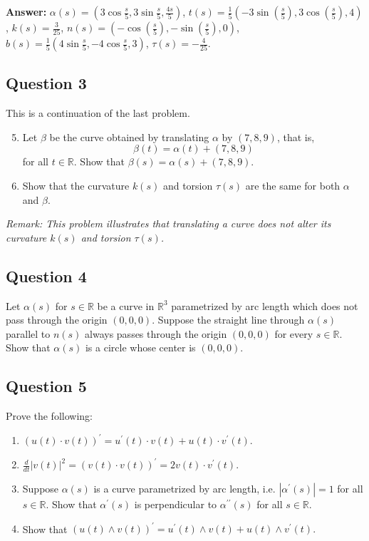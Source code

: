 \documentclass[12pt, a4paper]{article}
\newcommand{\R}{\mathbb{R}}
\begin{document}
\vspace{1em}
\noindent\textbf{Answer:}
$\alpha(s)=(3\cos\frac{s}{5},3\sin\frac{s}{5},\frac{4s}{5})$, 
$t(s)=\frac{1}{5}(-3\sin(\frac{s}{5}),3\cos(\frac{s}{5}),4)$, 
$k(s)=\frac{3}{25}$, 
$n(s)=(-\cos(\frac{s}{5}),-\sin(\frac{s}{5}),0)$, 
$b(s)=\frac{1}{5}(4\sin\frac{s}{5},-4\cos\frac{s}{5},3)$, 
$\tau(s)=-\frac{4}{25}$.
\newpage

\subsection*{Question 3}
This is a continuation of the last problem.
\begin{enumerate}[label=(\roman*)]
    \setcounter{enumi}{4}
    \item Let $\beta$ be the curve obtained by translating $\alpha$ by $(7, 8, 9)$, that is,
    \[ \beta(t)=\alpha(t)+(7,8,9) \]
    for all $t\in\R$. Show that $\beta(s)=\alpha(s)+(7,8,9)$.
    \item Show that the curvature $k(s)$ and torsion $\tau(s)$ are the same for both $\alpha$ and $\beta$.
\end{enumerate}

\vspace{1em}
\noindent\textit{Remark: This problem illustrates that translating a curve does not alter its curvature $k(s)$ and torsion $\tau(s)$.}
\newpage

\subsection*{Question 4}
Let $\alpha(s)$ for $s\in\R$ be a curve in $\R^{3}$ parametrized by arc length which does not pass through the origin $(0,0,0)$. Suppose the straight line through $\alpha(s)$ parallel to $n(s)$ always passes through the origin $(0,0,0)$ for every $s\in\R$. Show that $\alpha(s)$ is a circle whose center is $(0,0,0)$.
\newpage

\subsection*{Question 5}
Prove the following:
\begin{enumerate}[label=(\roman*)]
    \item $(u(t)\cdot v(t))^{\prime}=u^{\prime}(t)\cdot v(t)+u(t)\cdot v^{\prime}(t).$
    \item $\frac{d}{dt}|v(t)|^{2}=(v(t)\cdot v(t))^{\prime}=2v(t)\cdot v^{\prime}(t).$
    \item Suppose $\alpha(s)$ is a curve parametrized by arc length, i.e. $|\alpha^{\prime}(s)|=1$ for all $s\in\R.$ Show that $\alpha^{\prime}(s)$ is perpendicular to $\alpha^{\prime\prime}(s)$ for all $s\in\R.$
    \item Show that $(u(t)\wedge v(t))^{\prime}=u^{\prime}(t)\wedge v(t)+u(t)\wedge v^{\prime}(t).$
\end{enumerate}
\end{document}
